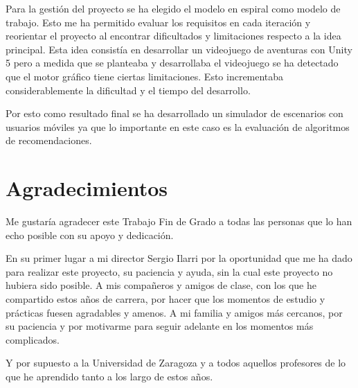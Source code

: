 Para la gestión del proyecto se ha elegido el modelo en espiral como modelo de trabajo. Esto me ha permitido evaluar los requisitos en cada iteración y reorientar el proyecto al encontrar dificultados y limitaciones respecto a la idea principal. Esta idea consistía en desarrollar un videojuego de aventuras con Unity 5 pero a medida que se planteaba y desarrollaba el videojuego se ha detectado que el motor gráfico tiene ciertas limitaciones. Esto incrementaba considerablemente la dificultad y el tiempo del desarrollo. 

Por esto como resultado final se ha desarrollado un simulador de escenarios con usuarios móviles ya que lo importante en este caso es la evaluación de algoritmos de recomendaciones.

\cleardoublepage


\thispagestyle{empty}


\chapter*{Agradecimientos}
\thispagestyle{empty}

       \vspace{1cm}


Me gustaría agradecer este Trabajo Fin de Grado a todas las personas que lo han echo posible con su apoyo y dedicación.

\vspace{1cm}
En su primer lugar a mi director Sergio Ilarri por la oportunidad que me ha dado para realizar este proyecto, su paciencia y ayuda, sin la cual este proyecto no hubiera sido posible. A mis compañeros y amigos de clase, con los que he compartido estos años de carrera, por hacer que los momentos de estudio y prácticas fuesen agradables y amenos. A mi familia y amigos más cercanos, por su paciencia y por motivarme para seguir adelante en los momentos más complicados.

\vspace{1cm}
Y por supuesto a la Universidad de Zaragoza y a todos aquellos profesores de lo que he aprendido tanto a los largo de estos años.

\cleardoublepage
